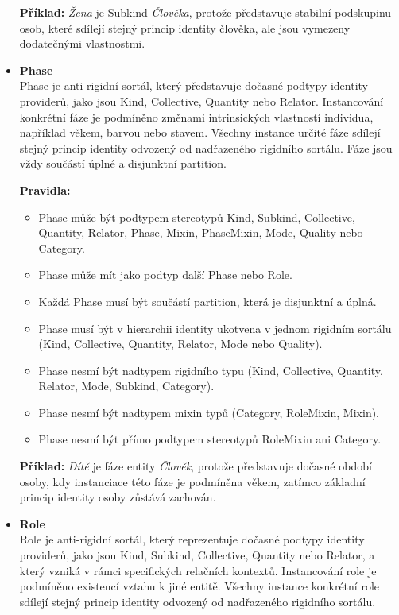\begin{itemize}
  \textbf{Příklad:} \textit{Žena} je Subkind \textit{Člověka}, protože představuje stabilní podskupinu osob, které sdílejí stejný princip identity člověka, ale jsou vymezeny dodatečnými vlastnostmi.


  \item \textbf{Phase} \\
  Phase je anti-rigidní sortál, který představuje dočasné podtypy identity providerů, jako jsou Kind, Collective, Quantity nebo Relator. Instancování konkrétní fáze je podmíněno změnami intrinsických vlastností individua, například věkem, barvou nebo stavem. Všechny instance určité fáze sdílejí stejný princip identity odvozený od nadřazeného rigidního sortálu. Fáze jsou vždy součástí úplné a disjunktní partition. \cite{KOM_prezentace2,ontouml_class_stereotypes}

  \textbf{Pravidla:}
  \begin{itemize}
    \item Phase může být podtypem stereotypů Kind, Subkind, Collective, Quantity, Relator, Phase, Mixin, PhaseMixin, Mode, Quality nebo Category.
    \item Phase může mít jako podtyp další Phase nebo Role.
    \item Každá Phase musí být součástí partition, která je disjunktní a úplná.
    \item Phase musí být v hierarchii identity ukotvena v jednom rigidním sortálu (Kind, Collective, Quantity, Relator, Mode nebo Quality).
    \item Phase nesmí být nadtypem rigidního typu (Kind, Collective, Quantity, Relator, Mode, Subkind, Category).
    \item Phase nesmí být nadtypem mixin typů (Category, RoleMixin, Mixin).
    \item Phase nesmí být přímo podtypem stereotypů RoleMixin ani Category. \cite{ontouml_class_stereotypes}
  \end{itemize}

  \textbf{Příklad:} \textit{Dítě} je fáze entity \textit{ Člověk}, protože představuje dočasné období osoby, kdy instanciace této fáze je podmíněna věkem, zatímco základní princip identity osoby zůstává zachován.


  \item \textbf{Role} \\
  Role je anti-rigidní sortál, který reprezentuje dočasné podtypy identity providerů, jako jsou Kind, Subkind, Collective, Quantity nebo Relator, a který vzniká v rámci specifických relačních kontextů. Instancování role je podmíněno existencí vztahu k jiné entitě. Všechny instance konkrétní role sdílejí stejný princip identity odvozený od nadřazeného rigidního sortálu. \cite{KOM_prezentace2,ontouml_class_stereotypes}


\end{itemize}
